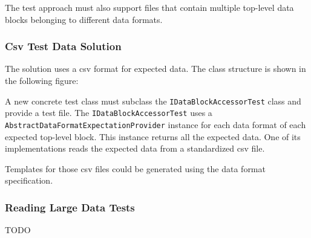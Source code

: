The test approach must also support files that contain multiple top-level data blocks belonging to different data formats.


\subsubsection{Csv Test Data Solution}
\label{sec:CsvTestDataSolution}

The solution uses a csv format for expected data. The class structure is shown in the following figure:


A new concrete test class must subclass the \texttt{IDataBlockAccessorTest} class and provide a test file. The \texttt{IDataBlockAccessorTest} uses a \texttt{AbstractDataFormatExpectationProvider} instance for each data format of each expected top-level block. This instance returns all the expected data. One of its implementations reads the expected data from a standardized csv file.

Templates for those csv files could be generated using the data format specification. 


\subsubsection{Reading Large Data Tests}
\label{sec:ReadingLargeDataTests}

TODO

%
%
